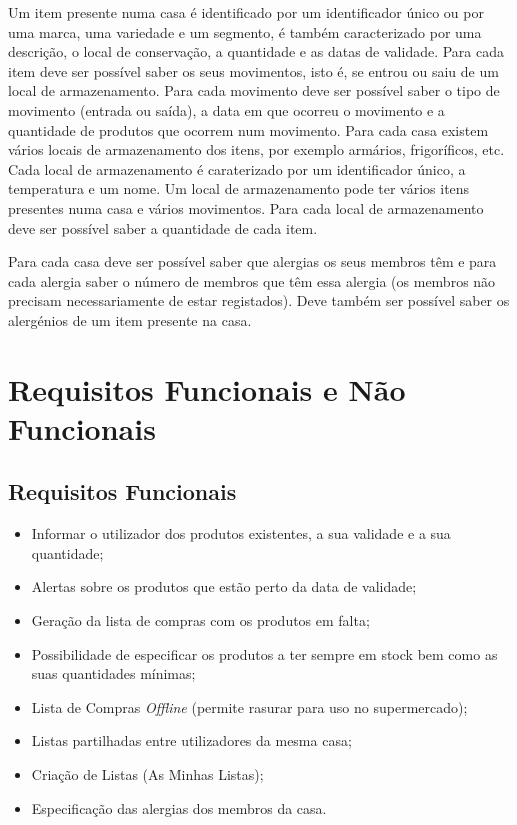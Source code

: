Um item presente numa casa é identificado por um identificador único ou por uma marca, uma variedade e um segmento, é também caracterizado por uma descrição, o local de conservação, a quantidade e as datas de validade. Para cada item deve ser possível saber os seus movimentos, isto é, se entrou ou saiu de um local de armazenamento. Para cada movimento deve ser possível saber o tipo de movimento (entrada ou saída), a data em que ocorreu o movimento e a quantidade de produtos que ocorrem num movimento.
Para cada casa existem vários locais de armazenamento dos itens, por exemplo armários, frigoríficos, etc. Cada local de armazenamento é caraterizado por um identificador único, a temperatura e um nome. Um local de armazenamento pode ter vários itens presentes numa casa e vários movimentos. Para cada local de armazenamento deve ser possível saber a quantidade de cada item.

Para cada casa deve ser possível saber que alergias os seus membros têm e para cada alergia saber o número de membros que têm essa alergia (os membros não precisam necessariamente de estar registados). Deve também ser possível saber os alergénios de um item presente na casa.



%
%
\section{Requisitos Funcionais e Não Funcionais} \label{sec22}

\subsection{Requisitos Funcionais}
\begin{itemize}
	\item Informar o utilizador dos produtos existentes, a sua validade e a sua quantidade;
	\item Alertas sobre os produtos que estão perto da data de validade;
	\item Geração da lista de compras com os produtos em falta;
	\item Possibilidade de especificar os produtos a ter sempre em stock bem como as suas quantidades mínimas;	
	\item Lista de Compras \textit{Offline} (permite rasurar para uso no supermercado);
	\item Listas partilhadas entre utilizadores da mesma casa;
	\item Criação de Listas (As Minhas Listas);
	\item Especificação das alergias dos membros da casa.
\end{itemize}


